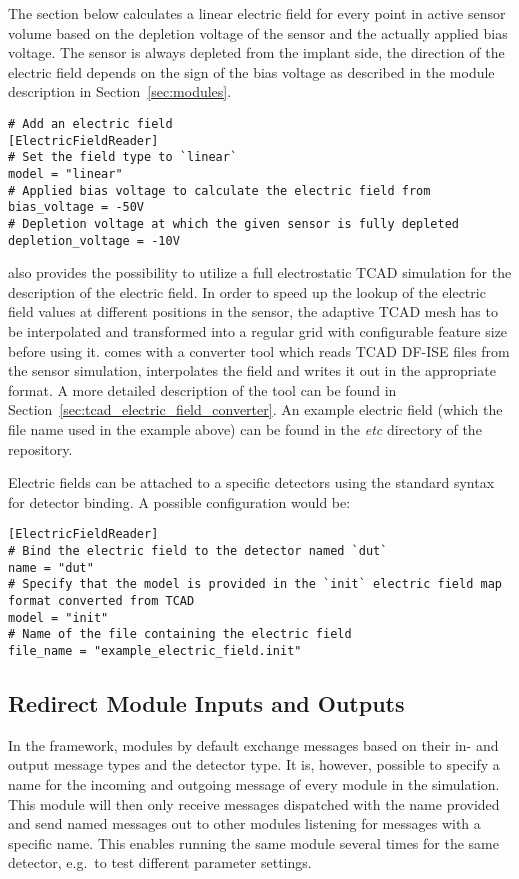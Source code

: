 The section below calculates a linear electric field for every point in active sensor volume based on the depletion voltage of the sensor and the actually applied bias voltage.
The sensor is always depleted from the implant side, the direction of the electric field depends on the sign of the bias voltage as described in the module description in Section~\ref{sec:modules}.
\begin{verbatim}
# Add an electric field
[ElectricFieldReader]
# Set the field type to `linear`
model = "linear"
# Applied bias voltage to calculate the electric field from
bias_voltage = -50V
# Depletion voltage at which the given sensor is fully depleted
depletion_voltage = -10V
\end{verbatim}

\apsq also provides the possibility to utilize a full electrostatic TCAD simulation for the description of the electric field.
In order to speed up the lookup of the electric field values at different positions in the sensor, the adaptive TCAD mesh has to be interpolated and transformed into a regular grid with configurable feature size before using it.
\apsq comes with a converter tool which reads TCAD DF-ISE files from the sensor simulation, interpolates the field and writes it out in the appropriate format.
A more detailed description of the tool can be found in Section~\ref{sec:tcad_electric_field_converter}.
An example electric field (which the file name used in the example above) can be found in the \textit{etc} directory of the \apsq repository.

Electric fields can be attached to a specific detectors using the standard syntax for detector binding.
A possible configuration would be:
\begin{verbatim}
[ElectricFieldReader]
# Bind the electric field to the detector named `dut`
name = "dut"
# Specify that the model is provided in the `init` electric field map format converted from TCAD
model = "init"
# Name of the file containing the electric field
file_name = "example_electric_field.init"
\end{verbatim}


\subsection{Redirect Module Inputs and Outputs}
\label{sec:redirect_module_input_outputs}
In the \apsq framework, modules by default exchange messages based on their in- and output message types and the detector type.
It is, however, possible to specify a name for the incoming and outgoing message of every module in the simulation.
This module will then only receive messages dispatched with the name provided and send named messages out to other modules listening for messages with a specific name.
This enables running the same module several times for the same detector, e.g.\ to test different parameter settings.

